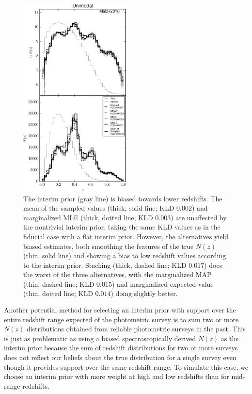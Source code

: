 \documentclass[preprint]{aastex}
\begin{document}

\begin{figure}
\includegraphics[width=0.5\textwidth]{figs/uint/comps.pdf}
\caption{The interim prior (gray line) is biased towards lower redshifts.  The 
mean of the sampled values (thick, solid line; KLD $0.002$) and marginalized 
MLE (thick, dotted line; KLD $0.003$) are unaffected by the nontrivial interim 
prior, taking the same KLD values as in the fiducial case with a flat interim 
prior.  However, the alternatives yield biased estimates, both smoothing the 
features of the true $N(z)$ (thin, solid line) and showing a bias to low 
redshift values according to the interim prior.  Stacking (thick, dashed line; 
KLD $0.017$) does the worst of the three alternatives, with the marginalized 
MAP (thin, dashed line; KLD $0.015$) and marginalized expected value (thin, 
dotted line; KLD $0.014$) doing slightly better.}
\label{fig:intu-comp}
\end{figure}

Another potential method for selecting an interim prior with support over the 
entire redshift range expected of the photometric survey is to sum two or more 
$N(z)$ distributions obtained from reliable photometric surveys in the past.  
This is just as problematic as using a biased spectroscopically derived $N(z)$ 
as the interim prior because the sum of redshift distributions for two or more 
surveys does not reflect our beliefs about the true distribution for a single 
survey even though it provides support over the same redshift range.  To 
simulate this case, we choose an interim prior with more weight at high and low 
redshifts than for mid-range redshifts.  
\end{document}
